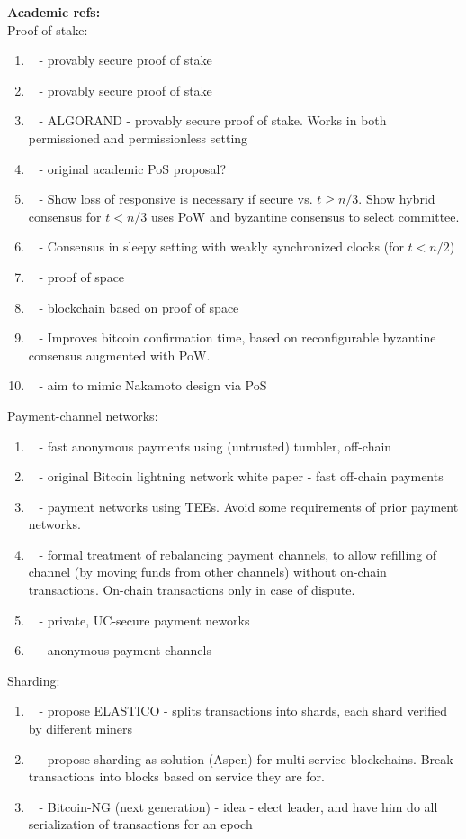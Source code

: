 \noindent
\textbf{Academic refs:}\\
Proof of stake:
\begin{enumerate}
\item ~\cite{CRYPTO:KRDO17} - provably secure proof of stake
\item ~\cite{eprint:BenPasShi16} - provably secure proof of stake
\item ~\cite{SOSP:GHMVZ17} - ALGORAND - provably secure proof of stake.  Works in both permissioned and permissionless setting
\item ~\cite{FC:BenGabMiz16} - original academic PoS proposal?
\item ~\cite{DISC:PasShi17} - Show loss of responsive is necessary if secure vs. $t\ge n/3$.  Show hybrid consensus for $t< n/3$ uses PoW and byzantine consensus to select committee.
\item ~\cite{AC:PasShi17} - Consensus in sleepy setting with weakly synchronized clocks (for $t<n/2$)
\item ~\cite{CRYPTO:DFKP15} - proof of space
\item ~\cite{eprint:PPKAFG15} - blockchain based on proof of space
\item ~\cite{OPODIS:AMNRS17} - Improves bitcoin confirmation time, based on reconfigurable byzantine consensus augmented with PoW.
\item ~\cite{eprint:FanZho17} - aim to mimic Nakamoto design via PoS
\end{enumerate}
Payment-channel networks:
\begin{enumerate}
\item ~\cite{NDSS:HABSG17} - fast anonymous payments using (untrusted) tumbler, off-chain
\item ~\cite{PooDry16} - original Bitcoin lightning network white paper - fast off-chain payments
\item ~\cite{SYSTOR:LNEKPS18} - payment networks using TEEs.  Avoid some requirements of prior payment networks.
\item ~\cite{CCS:KhaGer17} - formal treatment of rebalancing payment channels, to allow refilling of channel (by moving funds from other channels) without on-chain transactions.  On-chain transactions only in case of dispute.
\item ~\cite{CCS:MMKMR17} - private, UC-secure payment neworks
\item ~\cite{CCS:GreMie17} - anonymous payment channels
\end{enumerate}
Sharding:
\begin{enumerate}
\item ~\cite{CCS:LNZBGS16} - propose ELASTICO - splits transactions into shards, each shard verified by different miners
\item ~\cite{FC:GenRenSir17} - propose sharding as solution (Aspen) for multi-service blockchains.  Break transactions into blocks based on service they are for.
\item ~\cite{NSDI:EGSR16} - Bitcoin-NG (next generation) - idea - elect leader, and have him do all serialization of transactions for an epoch
\end{enumerate}
